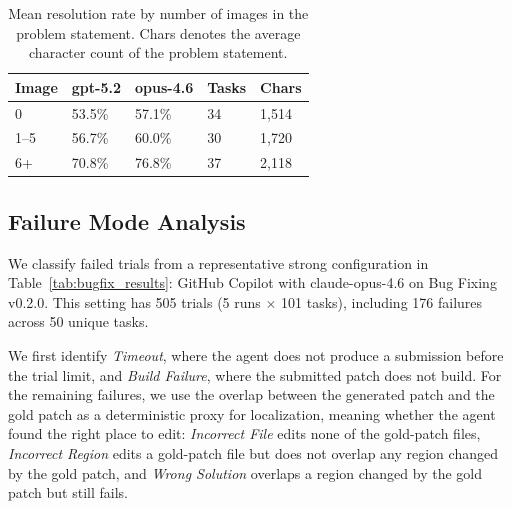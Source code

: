 \documentclass{article}
\begin{document}
\begin{table}[t]
\vskip 0.05in
\begin{center}
\begin{small}
\begin{sc}
\begin{tabular}{lllll}
\toprule
\textbf{Image} & \textbf{gpt-5.2} & \textbf{opus-4.6} & \textbf{Tasks} & \textbf{Chars} \\
\midrule
0   & 53.5\% & 57.1\% & 34 & 1,514 \\
1--5 & 56.7\% & 60.0\% & 30 & 1,720 \\
6+  & 70.8\% & 76.8\% & 37 & 2,118 \\
\bottomrule
\end{tabular}
\end{sc}
\end{small}
\end{center}
\caption{Mean resolution rate by number of images in the problem statement. Chars denotes the average character count of the problem statement.}
\label{tab:resolution_by_image_count}
\vskip 0.1in
\end{table}

\subsection{Failure Mode Analysis}
\label{sec:failure-modes}

We classify failed trials from a representative strong configuration in Table~\ref{tab:bugfix_results}: GitHub Copilot with claude-opus-4.6 on Bug Fixing v0.2.0. This setting has 505 trials (5 runs $\times$ 101 tasks), including 176 failures across 50 unique tasks.

We first identify \emph{Timeout}, where the agent does not produce a submission before the trial limit, and \emph{Build Failure}, where the submitted patch does not build. For the remaining failures, we use the overlap between the generated patch and the gold patch as a deterministic proxy for localization, meaning whether the agent found the right place to edit: \emph{Incorrect File} edits none of the gold-patch files, \emph{Incorrect Region} edits a gold-patch file but does not overlap any region changed by the gold patch, and \emph{Wrong Solution} overlaps a region changed by the gold patch but still fails.
\end{document}
